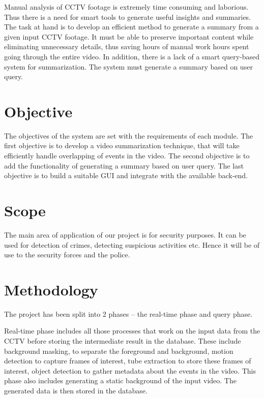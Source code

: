 Manual analysis of CCTV footage is extremely time consuming and laborious. Thus there is a need for smart tools to generate useful insights and summaries.
The task at hand is to develop an efficient method to generate a summary from a given input CCTV footage. It must be able to preserve important content while eliminating unnecessary details, thus saving hours of manual work hours spent going through the entire video. In addition, there is a lack of a smart query-based system for summarization. The system must generate a summary based on user query.


\section{Objective}

The objectives of the system are set with the requirements of each module. The first objective is to develop a video summarization technique, that will take efficiently handle overlapping of events in the video. The second objective is to add the functionality of generating a summary based on user query. The last objective is to build a suitable GUI and integrate with the available back-end.

\section{Scope}

The main area of application of our project is for security purposes. It can be used for detection of crimes, detecting suspicious activities etc. Hence it will be of use to the security forces and the police.

\section{Methodology}

The project has been split into 2 phases – the real-time phase and query phase.

Real-time phase includes all those processes that work on the input data from the CCTV before storing the intermediate result in the database. These include background masking, to separate the foreground and background, motion detection to capture frames of interest, tube extraction to store these frames of interest, object detection to gather metadata about the events in the video. This phase also includes generating a static background of the input video. The generated data is then stored in the database.

